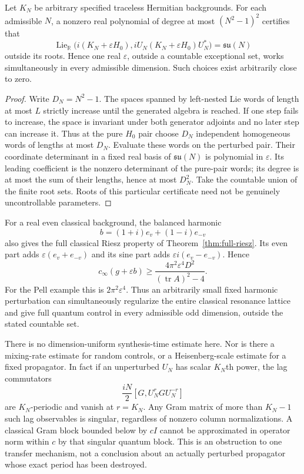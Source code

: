 \begin{theorem}\label{thm:simultaneous-control}
Let $K_N$ be arbitrary specified traceless Hermitian backgrounds. For each
admissible $N$, a nonzero real polynomial of degree at most $(N^2-1)^2$
certifies that
\[
 \operatorname{Lie}_{\mathbb R}
 \bigl(i(K_N+\varepsilon H_0),
       iU_N(K_N+\varepsilon H_0)U_N^*\bigr)=\mathfrak{su}(N)
\]
outside its roots. Hence one real $\varepsilon$, outside a countable
exceptional set, works simultaneously in every admissible dimension.
Such choices exist arbitrarily close to zero.
\end{theorem}
\begin{proof}
Write $D_N=N^2-1$. The spaces spanned by left-nested Lie words of length at
most $L$ strictly increase until the generated algebra is reached. If one
step fails to increase, the space is invariant under both generator
adjoints and no later step can increase it. Thus at the pure $H_0$ pair
choose $D_N$ independent homogeneous words of lengths at most $D_N$.
Evaluate these words on the perturbed pair. Their coordinate determinant in
a fixed real basis of $\mathfrak{su}(N)$ is polynomial in $\varepsilon$.
Its leading coefficient is the nonzero determinant of the pure-pair words;
its degree is at most the sum of their lengths, hence at most $D_N^2$.
Take the countable union of the finite root sets. Roots of this particular
certificate need not be genuinely uncontrollable parameters.
\end{proof}

For a real even classical background, the balanced harmonic
\[
 b=(1+i)e_v+(1-i)e_{-v}
\]
also gives the full classical Riesz property of
Theorem~\ref{thm:full-riesz}. Its even part adds
$\varepsilon(e_v+e_{-v})$ and its sine part adds
$\varepsilon i(e_v-e_{-v})$. Hence
\[
 c_\infty(g+\varepsilon b)
 \ge\frac{4\pi^2\varepsilon^4D^2}{(\operatorname{tr}A)^2-4}.
\]
For the Pell example this is $2\pi^2\varepsilon^4$.
Thus an arbitrarily small fixed harmonic perturbation can simultaneously
regularize the entire classical resonance lattice and give full quantum
control in every admissible odd dimension, outside the stated countable set.

There is no dimension-uniform synthesis-time estimate here. Nor is there a
mixing-rate estimate for random controls, or a Heisenberg-scale estimate for
a fixed propagator. In fact if an unperturbed $U_N$ has scalar $K_N$th power,
the lag commutators
\[
 \frac{iN}{2}[G,U_N^rGU_N^{-r}]
\]
are $K_N$-periodic and vanish at $r=K_N$. Any Gram matrix of more than
$K_N-1$ such lag observables is singular, regardless of nonzero column
normalizations. A classical Gram block bounded below by $cI$ cannot be
approximated in operator norm within $c$ by that singular quantum block.
This is an obstruction to one transfer mechanism, not a conclusion about
an actually perturbed propagator whose exact period has been destroyed.
